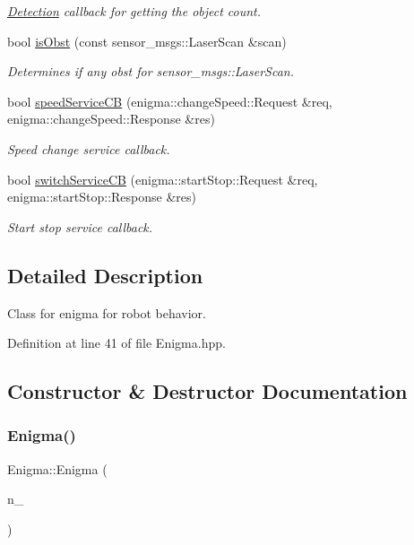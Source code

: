 \begin{DoxyCompactItemize}
\begin{DoxyCompactList}\small\item\em \hyperlink{class_detection}{Detection} callback for getting the object count. \end{DoxyCompactList}\item 
bool \hyperlink{class_enigma_af7d2843462441eb80555ba36d4f31401}{is\+Obst} (const sensor\+\_\+msgs\+::\+Laser\+Scan \&scan)
\begin{DoxyCompactList}\small\item\em Determines if any obst for sensor\+\_\+msgs\+::\+Laser\+Scan. \end{DoxyCompactList}\item 
bool \hyperlink{class_enigma_acc1fde6fec011f3f51a5198713262d22}{speed\+Service\+CB} (enigma\+::change\+Speed\+::\+Request \&req, enigma\+::change\+Speed\+::\+Response \&res)
\begin{DoxyCompactList}\small\item\em Speed change service callback. \end{DoxyCompactList}\item 
bool \hyperlink{class_enigma_a3ac35467cd1fd927e956ff351ed88e12}{switch\+Service\+CB} (enigma\+::start\+Stop\+::\+Request \&req, enigma\+::start\+Stop\+::\+Response \&res)
\begin{DoxyCompactList}\small\item\em Start stop service callback. \end{DoxyCompactList}\end{DoxyCompactItemize}


\subsection{Detailed Description}
Class for enigma for robot behavior. 

Definition at line 41 of file Enigma.\+hpp.



\subsection{Constructor \& Destructor Documentation}
\mbox{\label{class_enigma_a10f3e8731f96cb675c04cdac4dfb978a}} 
\subsubsection{\texorpdfstring{Enigma()}{Enigma()}}
{\footnotesize\ttfamily Enigma\+::\+Enigma (\begin{DoxyParamCaption}\item[{ros\+::\+Node\+Handle}]{n\+\_\+ }\end{DoxyParamCaption})\hspace{0.3cm}{\ttfamily [explicit]}}



